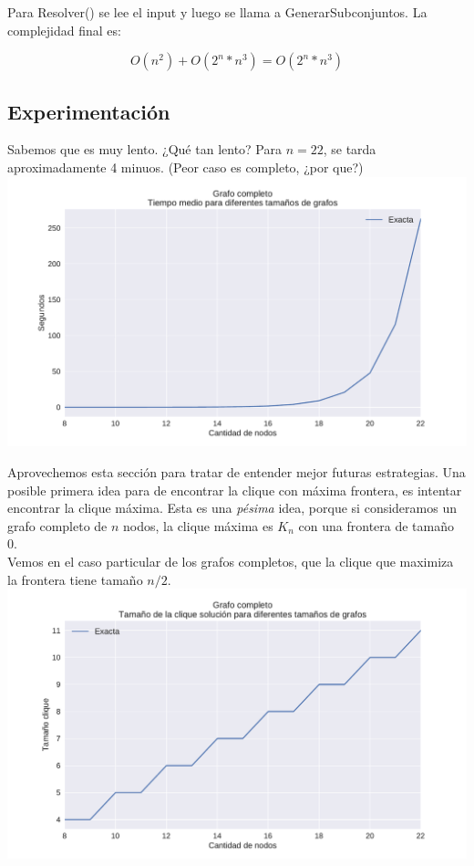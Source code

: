 Para Resolver() se lee el input y luego se llama a GenerarSubconjuntos. La complejidad final es:

$$ O(n^2) + O(2^{n} * n^{3}) = O(2^{n} * n^{3})$$

\subsection{Experimentación}


Sabemos que es muy lento. ¿Qué tan lento? Para $n = 22$, se tarda aproximadamente 4 minuos. (Peor caso es completo, ¿por que?) \\

{\centering
    \includegraphics[width=1\textwidth]{informe/imgs/exp_completo_tiempo_exacta.pdf} \\
}

Aprovechemos esta sección para tratar de entender mejor futuras estrategias. Una posible primera idea para de encontrar la clique con máxima frontera, es intentar encontrar la clique máxima. Esta es una \textit{pésima} idea, porque si consideramos un grafo completo de $n$ nodos, la clique máxima es $K_n$ con una frontera de tamaño 0. \\

Vemos en el caso particular de los grafos completos, que la clique que maximiza la frontera tiene tamaño $n/2$. \\

{\centering
    \includegraphics[width=1\textwidth]{informe/imgs/exp_completo_clique_exacta.pdf} \\
}

